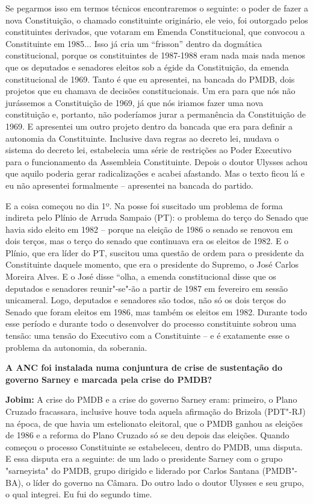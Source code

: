 Se pegarmos isso em termos técnicos encontraremos o seguinte: o poder de
fazer a nova Constituição, o chamado constituinte originário, ele veio,
foi outorgado pelos constituintes derivados, que votaram em Emenda
Constitucional, que convocou a Constituinte em 1985... Isso já cria um
``frisson'' dentro da dogmática constitucional, porque os constituintes
de 1987-1988 eram nada mais nada menos que os deputados e senadores
eleitos sob a égide da Constituição, da emenda constitucional de 1969.
Tanto é que eu apresentei, na bancada do PMDB, dois projetos que eu
chamava de decisões constitucionais. Um era para que nós não jurássemos
a Constituição de 1969, já que nós iriamos fazer uma nova constituição
e, portanto, não poderíamos jurar a permanência da Constituição de 1969.
E apresentei um outro projeto dentro da bancada que era para definir a
autonomia da Constituinte. Inclusive dava regras ao decreto lei, mudava
o sistema do decreto lei, estabelecia uma série de restrições ao Poder
Executivo para o funcionamento da Assembleia Constituinte. Depois o
doutor Ulysses achou que aquilo poderia gerar radicalizações e acabei
afastando. Mas o texto ficou lá e eu não apresentei formalmente --
apresentei na bancada do partido.

E a coisa começou no dia 1º. Na posse foi suscitado um problema de forma
indireta pelo Plínio de Arruda Sampaio (PT): o problema do terço do
Senado que havia sido eleito em 1982 -- porque na eleição de 1986 o
senado se renovou em dois terços, mas o terço do senado que continuava
era os eleitos de 1982. E o Plínio, que era líder do PT, suscitou uma
questão de ordem para o presidente da Constituinte daquele momento, que
era o presidente do Supremo, o José Carlos Moreira Alves. E o José disse
``olha, a emenda constitucional disse que os deputados e senadores
reunir"-se"-ão a partir de 1987 em fevereiro em sessão unicameral. Logo,
deputados e senadores são todos, não só os dois terços do Senado que
foram eleitos em 1986, mas também os eleitos em 1982. Durante todo esse
período e durante todo o desenvolver do processo constituinte sobrou uma
tensão: uma tensão do Executivo com a Constituinte -- e é exatamente
esse o problema da autonomia, da soberania.

\textbf{A ANC foi instalada numa conjuntura de crise de sustentação do
governo Sarney e marcada pela crise do PMDB?}

\textbf{Jobim:} A crise do PMDB e a crise do governo Sarney eram:
primeiro, o Plano Cruzado fracassara, inclusive houve toda aquela
afirmação do Brizola (PDT"-RJ) na época, de que havia um estelionato
eleitoral, que o PMDB ganhou as eleições de 1986 e a reforma do Plano
Cruzado só se deu depois das eleições. Quando começou o processo
Constituinte se estabeleceu, dentro do PMDB, uma disputa. E essa disputa
era a seguinte: de um lado o presidente Sarney com o grupo "sarneyista"
do PMDB, grupo dirigido e liderado por Carlos Santana (PMDB"-BA), o líder
do governo na Câmara. Do outro lado o doutor Ulysses e seu grupo, o qual
integrei. Eu fui do segundo time.

